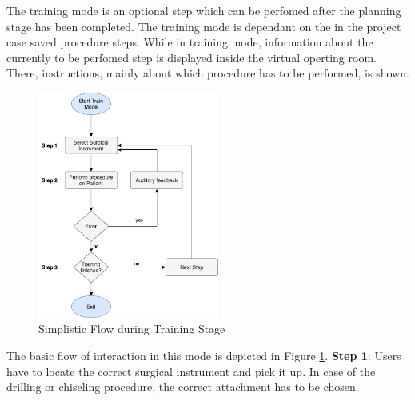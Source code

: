 The training mode is an optional step which can be perfomed after the planning stage has been completed.
The training mode is dependant on the in the project case saved procedure steps.
While in training mode, information about the currently to be perfomed step is displayed inside the virtual operting room.
There, instructions, mainly about which procedure has to be performed, is shown.

\begin{figure}[h]
    \centering
    \includegraphics[width=225px]{images/implementation/features/training/training_flow.png}
    \caption{\label{fig::TrainingFlow}Simplistic Flow during Training Stage}
\end{figure}

The basic flow of interaction in this mode is depicted in Figure \ref{fig::TrainingFlow}.
\newline
\textbf{Step 1}: Users have to locate the correct surgical instrument and pick it up.
In case of the drilling or chiseling procedure, the correct attachment has to be chosen.

